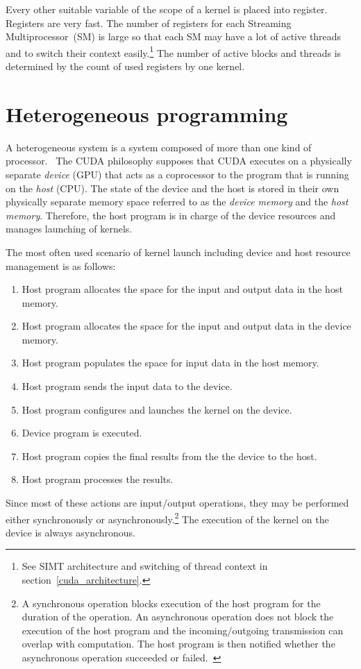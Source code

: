 \documentclass[12pt,oneside]{fithesis2}
\begin{document}
Every other suitable variable of the scope of a kernel is placed into register. Registers are very fast. The number of registers for each Streaming Multiprocessor~(SM) is large so that each SM may have a lot of active threads and to switch their context easily.\footnote{See SIMT architecture and switching of thread context in section~\ref{cuda_architecture}.} The number of active blocks and threads is determined by the count of used registers by one kernel.

\section{Heterogeneous programming}
\label{heterogeneous_programming}

A heterogeneous system is a system composed of more than one kind of processor.~\cite{professional_cuda} The CUDA philosophy supposes that CUDA executes on a physically separate \emph{device} (GPU) that acts as a coprocessor to the program that is running on the \emph{host} (CPU). The state of the device and the host is stored in their own physically separate memory space referred to as the \emph{device memory} and the \emph{host memory}. Therefore, the host program is in charge of the device resources and manages launching of kernels.~\cite{cuda_guide}

The most often used scenario of kernel launch including device and host resource management is as follows:
\begin{enumerate}[noitemsep]
	\item Host program allocates the space for the input and output data in the host memory.
	\item Host program allocates the space for the input and output data in the device memory.
	\item Host program populates the space for input data in the host memory.
	\item Host program sends the input data to the device.
	\item Host program configures and launches the kernel on the device.
	\item Device program is executed.
	\item Host program copies the final results from the the device to the host.
	\item Host program processes the results. 
\end{enumerate}

\noindent
Since most of these actions are input/output operations, they may be performed either synchronously or asynchronously.\footnote{A synchronous operation blocks execution of the host program for the duration of the operation. An asynchronous operation does not block the execution of the host program and the incoming/outgoing transmission can overlap with computation. The host program is then notified whether the asynchronous operation succeeded or failed.~\cite{async_io}} The execution of the kernel on the device is always asynchronous.~\cite{cuda_guide}
\end{document}
